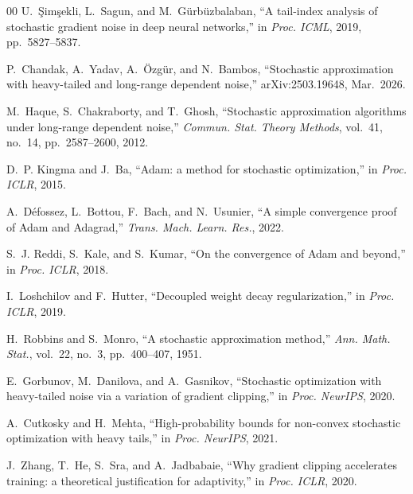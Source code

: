 \documentclass[conference]{IEEEtran}
\begin{document}
\begin{thebibliography}{00}
U.~\c{S}im\c{s}ekli, L.~Sagun, and M.~G\"{u}rb\"{u}zbalaban,
``A tail-index analysis of stochastic gradient noise in deep neural
networks,'' in \textit{Proc. ICML}, 2019, pp.~5827--5837.

P.~Chandak, A.~Yadav, A.~\"{O}zg\"{u}r, and N.~Bambos,
``Stochastic approximation with heavy-tailed and long-range dependent
noise,'' arXiv:2503.19648, Mar.\ 2026.

M.~Haque, S.~Chakraborty, and T.~Ghosh,
``Stochastic approximation algorithms under long-range dependent noise,''
\textit{Commun. Stat. Theory Methods}, vol.~41, no.~14,
pp.~2587--2600, 2012.

D.~P. Kingma and J.~Ba, ``Adam: a method for stochastic optimization,''
in \textit{Proc. ICLR}, 2015.

A.~D\'{e}fossez, L.~Bottou, F.~Bach, and N.~Usunier,
``A simple convergence proof of Adam and Adagrad,''
\textit{Trans. Mach. Learn. Res.}, 2022.

S.~J. Reddi, S.~Kale, and S.~Kumar,
``On the convergence of Adam and beyond,'' in \textit{Proc. ICLR}, 2018.

I.~Loshchilov and F.~Hutter,
``Decoupled weight decay regularization,'' in \textit{Proc. ICLR}, 2019.

H.~Robbins and S.~Monro,
``A stochastic approximation method,''
\textit{Ann. Math. Stat.}, vol.~22, no.~3, pp.~400--407, 1951.

E.~Gorbunov, M.~Danilova, and A.~Gasnikov,
``Stochastic optimization with heavy-tailed noise via a variation of
gradient clipping,'' in \textit{Proc. NeurIPS}, 2020.

A.~Cutkosky and H.~Mehta,
``High-probability bounds for non-convex stochastic optimization with
heavy tails,'' in \textit{Proc. NeurIPS}, 2021.

J.~Zhang, T.~He, S.~Sra, and A.~Jadbabaie,
``Why gradient clipping accelerates training: a theoretical justification
for adaptivity,'' in \textit{Proc. ICLR}, 2020.

\end{thebibliography}
\end{document}

